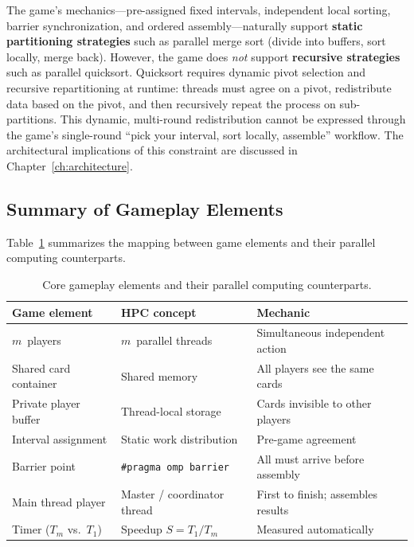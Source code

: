 The game's mechanics---pre-assigned fixed intervals, independent local sorting, barrier synchronization, and ordered assembly---naturally support \textbf{static partitioning strategies} such as parallel merge sort (divide into buffers, sort locally, merge back). However, the game does \emph{not} support \textbf{recursive strategies} such as parallel quicksort. Quicksort requires dynamic pivot selection and recursive repartitioning at runtime: threads must agree on a pivot, redistribute data based on the pivot, and then recursively repeat the process on sub-partitions. This dynamic, multi-round redistribution cannot be expressed through the game's single-round ``pick your interval, sort locally, assemble'' workflow. The architectural implications of this constraint are discussed in Chapter~\ref{ch:architecture}.

\subsection{Summary of Gameplay Elements}
\label{subsec:gameplay-elements-summary}

Table~\ref{tab:gameplay-elements} summarizes the mapping between game elements and their parallel computing counterparts.

\begin{table}[htbp]
    \centering
    \caption{Core gameplay elements and their parallel computing counterparts.}
    \label{tab:gameplay-elements}
    \begin{tabular}{@{}p{4.2cm}p{4.5cm}p{4.8cm}@{}}
        \toprule
        \textbf{Game element}    & \textbf{HPC concept}          & \textbf{Mechanic}                  \\
        \midrule
        $m$~players              & $m$~parallel threads          & Simultaneous independent action    \\
        \midrule
        Shared card container    & Shared memory                 & All players see the same cards     \\
        \midrule
        Private player buffer    & Thread-local storage          & Cards invisible to other players   \\
        \midrule
        Interval assignment      & Static work distribution      & Pre-game agreement                 \\
        \midrule
        Barrier point            & \texttt{\#pragma omp barrier} & All must arrive before assembly    \\
        \midrule
        Main thread player       & Master / coordinator thread   & First to finish; assembles results \\
        \midrule
        Timer ($T_m$ vs.\ $T_1$) & Speedup $S = T_1 / T_m$       & Measured automatically             \\
        \bottomrule
    \end{tabular}
\end{table}

